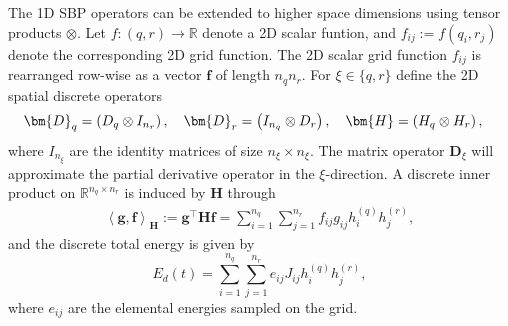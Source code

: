 \documentclass{article}
\numberwithin{equation}{section}
\def\R{\mathbb{R}}
\def\l{\left\langle}
\def\r{\right\rangle}
\def\1{\chi}
\theoremstyle{definition}
\begin{document}
	The 1D SBP operators can be extended to higher space dimensions using tensor products $\otimes$. Let $f:(q,r)\to \mathbb{R}$ denote a 2D scalar funtion, and $f_{ij} := {f}(q_i,r_j)$ denote the corresponding 2D grid function.
	The  2D scalar grid function $f_{ij}$ is rearranged row-wise as a vector $\bm{f}$ of length $n_qn_r$. For $\xi \in \{q,r\}$  define the 2D spatial discrete operators
     {
    \begin{align*}
\centering
&\bm{D}_{q} = \left( {D}_{ q} \otimes I_{n_r}\right), \quad \bm{D}_{r} = \left(I_{n_q} \otimes  {D}_{ r}\right), \quad
\bm{H} = \left( H_{q} \otimes H_r\right), 
\end{align*}
    where $I_{n_{\xi}}$ are the identity matrices of size $n_{\xi} \times n_{\xi}$. 
    }
    The matrix operator $\bm{D}_{\xi}$  will approximate the partial derivative operator in the $\xi$-direction. A discrete inner product on $\R^{n_{q} \times n_{r}}$ is induced by $\bm{H}$ through 
     \begin{align}
        \l \bm{g} , \bm{f} \r_{\bm{H}} := \bm{g}^\top \bm{H} \bm{f} = \sum_{i=1}^{n_q} \sum_{j=1}^{n_r} f_{ij}g_{ij} h_i^{(q)} h_j^{(r)}, 
    \end{align}
        and  the  discrete total energy   is given by
     \begin{equation}\label{eq:elemental_curv-discrete}
     E_d(t) = \sum_{i=1}^{n_q}\sum_{j=1}^{n_r} e_{ij}J_{ij} h_i^{(q)}h_j^{(r)}, 
\end{equation}
where $e_{ij}$ are the elemental energies sampled on the grid.
\end{document}
